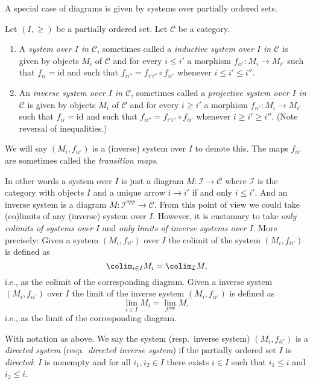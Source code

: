 \noindent
A special case of diagrams is given by systems over partially ordered sets.

\begin{definition}
\label{definition-system-over-poset}
Let $(I, \geq)$ be a partially ordered set.
Let $\mathcal{C}$ be a category.
\begin{enumerate}
\item A {\it system over $I$ in $\mathcal{C}$}, sometimes called a
{\it inductive system over $I$ in $\mathcal{C}$} is given by
objects $M_i$ of $\mathcal{C}$ and for every $i \leq i'$ a
morphism $f_{ii'} : M_i \to M_{i'}$ such that $f_{ii}
= \text{id}$ and such that $f_{ii''} = f_{i'i''} \circ f_{i i'}$
whenever $i \leq i' \leq i''$.
\item An {\it inverse system over $I$ in $\mathcal{C}$},
sometimes called a {\it projective system over $I$ in $\mathcal{C}$}
is given by objects $M_i$ of $\mathcal{C}$ and for every $i \geq i'$ a
morphism $f_{ii'} : M_i \to M_{i'}$ such that $f_{ii}
= \text{id}$ and such that $f_{ii''} = f_{i'i''} \circ f_{i i'}$
whenever $i \geq i' \geq i''$. (Note reversal of inequalities.)
\end{enumerate}
We will say $(M_i, f_{ii'})$ is a (inverse) system over $I$ to
denote this. The maps $f_{ii'}$ are sometimes
called the {\it transition maps}.
\end{definition}

\noindent
In other words a system over $I$ is just a diagram
$M : \mathcal{I} \to \mathcal{C}$ where $\mathcal{I}$ is the category with
objects $I$ and a unique arrow $i \to i'$ if and only
$i \leq i'$. And an inverse system is a diagram
$M : \mathcal{I}^{opp} \to \mathcal{C}$.
From this point of view we could take (co)limits of any (inverse)
system over $I$. However, it is customary to take
{\it only colimits of systems over $I$} and
{\it only limits of inverse systems over $I$}.
More precisely: Given a system $(M_i, f_{ii'})$
over $I$ the colimit of the system
$(M_i, f_{ii'})$ is defined as
$$
\colim_{i \in I} M_i = \colim_\mathcal{I} M,
$$
i.e., as the colimit of the corresponding diagram.
Given a inverse system $(M_i, f_{ii'})$ over $I$ the limit
of the inverse system $(M_i, f_{ii'})$ is defined as
$$
\lim_{i \in I} M_i = \lim_{\mathcal{I}^{opp}} M,
$$
i.e., as the limit of the corresponding diagram.

\begin{definition}
\label{definition-directed-system}
With notation as above.
We say the system (resp.\ inverse system) $(M_i, f_{ii'})$ is a
{\it directed system} (resp.\ {\it directed inverse system})
if the partially ordered set $I$ is {\it directed}: $I$ is nonempty and
for all $i_1, i_2 \in I$ there exists $i\in I$ such that
$i_1 \leq i$ and $i_2 \leq i$.
\end{definition}

